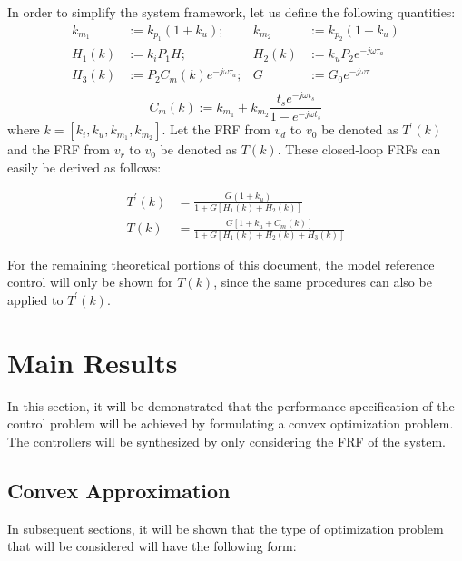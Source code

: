 \documentclass[a4paper, 10pt, conference]{ieeeconf}
\begin{document}
In order to simplify the system framework, let us define the following quantities:
\begin{equation} \label{eq:new_var}
\begin{aligned}
k_{m_1} &:= k_{p_1}(1+k_u) ;  &k_{m_2} &:= k_{p_2}(1+k_u)  \\
H_1(k) &:= k_iP_1H;  &H_2(k) &:= k_uP_2e^{-j\omega \tau_{a}} \\
H_3(k) &:=  P_2C_m(k)e^{-j\omega\tau_{a}}; &G &:= G_0e^{-j\omega\tau} \\ 
\end{aligned}
\end{equation}
\begin{equation*}
C_m(k) := k_{m_1}+k_{m_2}\frac{t_se^{-j\omega t_{s}}}{1-e^{-j\omega t_{s}}}
\end{equation*}
where $k = [k_i,k_u,k_{m_1},k_{m_2}]$. Let the FRF from $v_d$ to $v_0$ be denoted as $T^{\prime}(k)$ and the FRF from $v_r$ to $v_0$ be denoted as $T(k)$. These closed-loop FRFs can easily be derived as follows:

\begin{align}
T^{\prime}(k) &= \frac{G(1+k_u)}{1+G[H_1(k)+H_2(k)]} \label{eq:Tclp}  \\ 
T(k) &= \frac{G[1+k_u+C_m(k)]}{1+G[H_1(k)+H_2(k)+H_3(k)]}  \label{eq:Tcl} 
\end{align}

For the remaining theoretical portions of this document, the model reference control will only be shown for $T(k)$, since the same procedures can also be applied to $T^{\prime}(k)$. 

\section{Main Results}
\label{sec:main}
In this section, it will be demonstrated that the performance specification of the control problem will be achieved by formulating a convex optimization problem. The controllers will be synthesized by only considering the FRF of the system.

\subsection{Convex Approximation}
In subsequent sections, it will be shown that the type of optimization problem that will be considered will have the following form:
\end{document}
